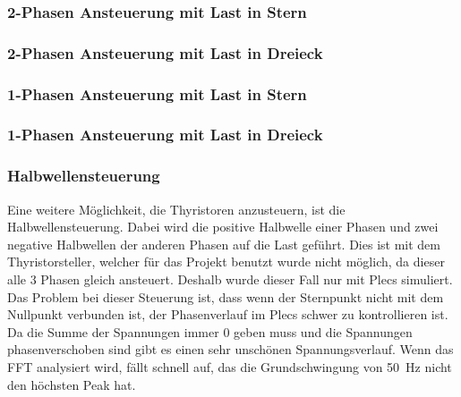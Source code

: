 \subsubsection*{2-Phasen Ansteuerung mit Last in Stern}

 
\subsubsection*{2-Phasen Ansteuerung mit Last in Dreieck}


\subsubsection*{1-Phasen Ansteuerung mit Last in Stern}


\subsubsection*{1-Phasen Ansteuerung mit Last in Dreieck}


\subsubsection*{Halbwellensteuerung}
Eine weitere Möglichkeit, die Thyristoren anzusteuern, ist die Halbwellensteuerung. Dabei wird die positive Halbwelle einer Phasen und zwei negative Halbwellen der anderen Phasen auf die Last geführt. Dies ist mit dem Thyristorsteller, welcher für das Projekt benutzt wurde nicht möglich, da dieser alle 3 Phasen gleich ansteuert. Deshalb wurde dieser Fall nur mit Plecs simuliert.  Das Problem bei dieser Steuerung ist, dass wenn der Sternpunkt nicht mit dem Nullpunkt verbunden ist, der Phasenverlauf im Plecs schwer zu kontrollieren ist. Da die Summe der Spannungen immer 0 geben muss und die Spannungen phasenverschoben sind gibt es einen sehr unschönen Spannungsverlauf. Wenn das FFT analysiert wird, fällt schnell auf, das die Grundschwingung von \SI{50}{Hz} nicht den höchsten Peak hat.



